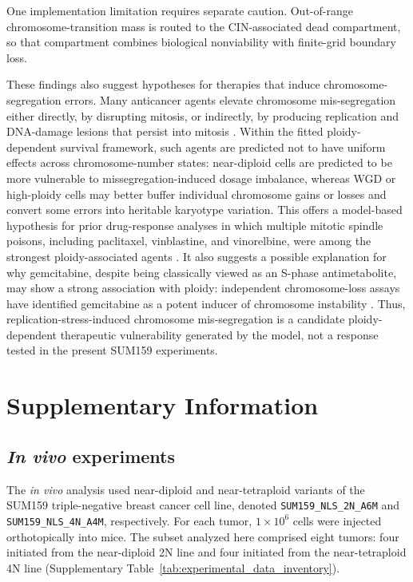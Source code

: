 \documentclass[11pt]{article}
\begin{document}
One implementation limitation requires separate caution. Out-of-range chromosome-transition mass is routed to the CIN-associated dead compartment, so that compartment combines biological nonviability with finite-grid boundary loss.

These findings also suggest hypotheses for therapies that induce chromosome-segregation errors. Many anticancer agents elevate chromosome mis-segregation either directly, by disrupting mitosis, or indirectly, by producing replication and DNA-damage lesions that persist into mitosis \cite{lee_effects_2016,zasadil_cytotoxicity_2014,scribano_chromosomal_2021,pedersen_topbp1_2015,chan_replication_2009,minocherhomji_replication_2015,beeharry_centromere_2013}. Within the fitted ploidy-dependent survival framework, such agents are predicted not to have uniform effects across chromosome-number states: near-diploid cells are predicted to be more vulnerable to missegregation-induced dosage imbalance, whereas WGD or high-ploidy cells may better buffer individual chromosome gains or losses and convert some errors into heritable karyotype variation. This offers a model-based hypothesis for prior drug-response analyses in which multiple mitotic spindle poisons, including paclitaxel, vinblastine, and vinorelbine, were among the strongest ploidy-associated agents \cite{kimmel_integrating_2020}. It also suggests a possible explanation for why gemcitabine, despite being classically viewed as an S-phase antimetabolite, may show a strong association with ploidy: independent chromosome-loss assays have identified gemcitabine as a potent inducer of chromosome instability \cite{lee_effects_2016}. Thus, replication-stress-induced chromosome mis-segregation is a candidate ploidy-dependent therapeutic vulnerability generated by the model, not a response tested in the present SUM159 experiments.

\section{Supplementary Information}


\renewcommand{\figurename}{Supplementary Figure}
\setcounter{figure}{0}
\renewcommand{\tablename}{Supplementary Table}
\setcounter{table}{0}

\subsection{\textit{In vivo} experiments}
\label{invivo}

The \textit{in vivo} analysis used near-diploid and near-tetraploid variants of the SUM159 triple-negative breast cancer cell line, denoted \texttt{SUM159\_NLS\_2N\_A6M} and \texttt{SUM159\_NLS\_4N\_A4M}, respectively. For each tumor, $1 \times 10^6$ cells were injected orthotopically into mice. The subset analyzed here comprised eight tumors: four initiated from the near-diploid 2N line and four initiated from the near-tetraploid 4N line (Supplementary Table~\ref{tab:experimental_data_inventory}).
\end{document}

